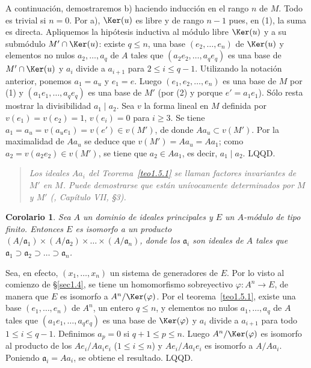 \documentclass[bibtotoc,leqno,spanish]{amsbook}
\newcommand{\idl}[1]{\mathfrak{#1}}
\newcommand{\QED}{LQQD.}
\renewcommand{\to}[1][]{\xrightarrow{#1}}
\numberwithin{equation}{section}
\newenvironment{comm}%
	{\begin{quotation}\itshape}
	{\end{quotation}}
\theoremstyle{note}
\theoremstyle{note}
\newtheorem{corollary}{Corolario}
\theoremstyle{rem}
\numberwithin{theorem}{section}
\numberwithin{proposition}{section}
\numberwithin{definition}{section}
\numberwithin{lemma}{section}
\numberwithin{corollary}{section}
\numberwithin{example}{section}
\numberwithin{footnote}{section}%
\begin{document}
A continuaci\'on, demostraremos b) haciendo inducci\'on en el rango $n$ de $M$. Todo es trivial
si $n = 0$. Por a), $\Ker(u)$ es libre y de rango $n-1$ pues, en (1), la suma es directa. Apliquemos
la hip\'otesis inductiva al m\'odulo libre $\Ker(u)$ y a su subm\'odulo $M'\cap\Ker(u)$:
existe $q\leq n$, una base $(e_{2},\dots,e_{n})$ de $\Ker(u)$ y elementos no nulos
$a_{2},\dots,a_{q}$ de $A$ tales que $(a_{2}e_{2},\dots,a_{q}e_{q})$ es una base de
$M'\cap\Ker(u)$ y $a_{i}$ divide a $a_{i+1}$ para $2\leq i\leq q-1$. Utilizando la notaci\'on
anterior, ponemos $a_{1} = a_{u}$ y $e_{1} = e$. Luego $(e_{1},e_{2},\dots,e_{n})$ es una base
de $M$ por (1) y $(a_{1}e_{1},\dots,a_{q}e_{q})$ es una base de $M'$ (por (2) y porque
$e' = a_{1}e_{1}$). S\'olo resta mostrar la divisibilidad $a_{1}\mid a_{2}$. Sea $v$ la
forma lineal en $M$ definida por $v(e_{1}) = v(e_{2}) = 1$, $v(e_{i}) = 0$ para $i\geq 3$.
Se tiene $a_{1} = a_{u} = v(a_{u}e_{1}) = v(e')\in v(M')$, de donde $Aa_{u}\subset v(M')$.
Por la maximalidad de $Aa_{u}$ se deduce que $v(M') = Aa_{u} = Aa_{1}$; como $a_{2} = v(a_{2}e_{2})
\in v(M')$, se tiene que $a_{2}\in Aa_{1}$, es decir, $a_{1}\mid a_{2}$. \QED

\begin{comm}
Los ideales $Aa_{i}$ del Teorema~\ref{teo1.5.1} se llaman {\em factores
invariantes} de $M'$ en $M$. Puede demostrarse que est\'an un\'ivocamente determinados
por $M$ y $M'$ (\cite{Bourbaki1}, Cap\'itulo VII, \S3).
\end{comm}

\begin{corollary}\label{cor1.5.1}
Sea $A$ un dominio de ideales principales y $E$ un $A$-m\'odulo
de tipo finito. Entonces $E$ es isomorfo a un producto
$(A/\idl{a}_{1})\times(A/\idl{a}_{2})\times\dots\times
(A/\idl{a}_{n})$, donde los $\idl{a}_{i}$ son ideales de $A$
tales que $\idl{a}_{1}\supset\idl{a}_{2}\supset\dots\supset
\idl{a}_{n}$.
\end{corollary}

Sea, en efecto, $(x_{1},\dots,x_{n})$ un sistema de generadores de $E$. Por lo visto
al comienzo de \S\ref{sec1.4}, se tiene un homomorfismo sobreyectivo $\varphi:A^{n}\to E$, de manera
que $E$ es isomorfo a $A^{n}/\Ker(\varphi)$. Por el teorema~\ref{teo1.5.1},
existe una base $(e_{1},\dots,e_{n})$
de $A^{n}$, un entero $q\leq n$, y elementos no nulos $a_{1},\dots,a_{q}$ de $A$ tales que
$(a_{1}e_{1},\dots,a_{q}e_{q})$ es una base de $\Ker(\varphi)$ y $a_{i}$ divide a $a_{i+1}$ para
todo $1\leq i\leq q-1$. Definimos $a_{p} = 0$ si $q+1\leq p\leq n$. Luego $A^{n}/\Ker(\varphi)$
es isomorfo al producto de los $Ae_{i}/Aa_{i}e_{i}$ ($1\leq i\leq n$) y $Ae_{i}/Aa_{i}e_{i}$
es isomorfo a $A/Aa_{i}$. Poniendo $\idl{a}_{i} = Aa_{i}$, se obtiene el resultado. \QED
\end{document}
